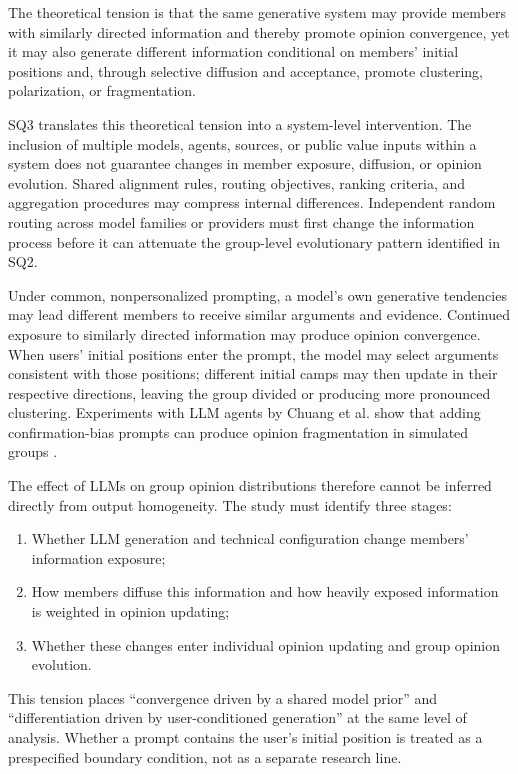 \documentclass[11pt,a4paper]{article}
\begin{document}
The theoretical tension is that the same generative system may provide members with similarly directed information and thereby promote opinion convergence, yet it may also generate different information conditional on members' initial positions and, through selective diffusion and acceptance, promote clustering, polarization, or fragmentation.

SQ3 translates this theoretical tension into a system-level intervention. The inclusion of multiple models, agents, sources, or public value inputs within a system does not guarantee changes in member exposure, diffusion, or opinion evolution. Shared alignment rules, routing objectives, ranking criteria, and aggregation procedures may compress internal differences. Independent random routing across model families or providers must first change the information process before it can attenuate the group-level evolutionary pattern identified in SQ2.

Under common, nonpersonalized prompting, a model's own generative tendencies may lead different members to receive similar arguments and evidence. Continued exposure to similarly directed information may produce opinion convergence. When users' initial positions enter the prompt, the model may select arguments consistent with those positions; different initial camps may then update in their respective directions, leaving the group divided or producing more pronounced clustering. Experiments with LLM agents by Chuang et al. show that adding confirmation-bias prompts can produce opinion fragmentation in simulated groups \cite{chuang2024}.

The effect of LLMs on group opinion distributions therefore cannot be inferred directly from output homogeneity. The study must identify three stages:

\begin{enumerate}
\item Whether LLM generation and technical configuration change members' information exposure;
\item How members diffuse this information and how heavily exposed information is weighted in opinion updating;
\item Whether these changes enter individual opinion updating and group opinion evolution.
\end{enumerate}

This tension places ``convergence driven by a shared model prior'' and ``differentiation driven by user-conditioned generation'' at the same level of analysis. Whether a prompt contains the user's initial position is treated as a prespecified boundary condition, not as a separate research line.
\end{document}
